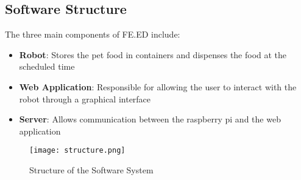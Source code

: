     
        
    \subsection{Software Structure}
    
    The three main components of FE.ED include:
    \begin{itemize}
        \item \textbf{Robot}: Stores the pet food in containers and dispenses the food at the scheduled time 
        \item \textbf{Web Application}: Responsible for allowing the user to interact with the robot through a graphical interface
        \item \textbf{Server}: Allows communication between the raspberry pi and the web application
    \end{itemize}
    
      \begin{figure}[h]
        \centering
        \texttt{[image: structure.png]}
         \caption{Structure of the Software System}
        \end{figure}
    
